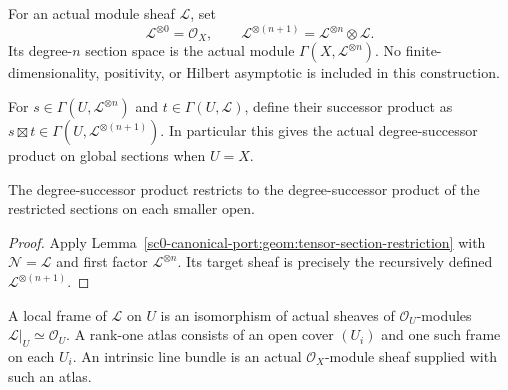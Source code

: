 \begin{definition}
\label{sc0-canonical-port:geom:tensor-sheaf-powers}
\leanok
For an actual module sheaf \(\mathcal L\), set
\[
 \mathcal L^{\otimes0}=\mathcal O_X,\qquad
 \mathcal L^{\otimes(n+1)}=\mathcal L^{\otimes n}\otimes\mathcal L.
\]
Its degree-\(n\) section space is the actual module
\(\Gamma(X,\mathcal L^{\otimes n})\).
No finite-dimensionality, positivity, or Hilbert asymptotic is
included in this construction.
\end{definition}

\begin{definition}
\label{sc0-canonical-port:geom:successor-section-product}
\leanok
For \(s\in\Gamma(U,\mathcal L^{\otimes n})\) and
\(t\in\Gamma(U,\mathcal L)\), define their successor product
as \(s\boxtimes t\in\Gamma(U,\mathcal L^{\otimes(n+1)})\).
In particular this gives the actual degree-successor product on
global sections when \(U=X\).
\end{definition}

\begin{lemma}
\label{sc0-canonical-port:geom:successor-product-restriction}
\leanok
The degree-successor product restricts to the degree-successor
product of the restricted sections on each smaller open.
\end{lemma}
\begin{proof}
Apply Lemma~\ref{sc0-canonical-port:geom:tensor-section-restriction} with
\(\mathcal N=\mathcal L\) and first factor
\(\mathcal L^{\otimes n}\). Its target sheaf is precisely the
recursively defined \(\mathcal L^{\otimes(n+1)}\).
\end{proof}

\begin{definition}
\label{sc0-canonical-port:geom:local-line-bundle-frames}
\leanok
A local frame of \(\mathcal L\) on \(U\) is an isomorphism of
actual sheaves of \(\mathcal O_U\)-modules
\(\mathcal L|_U\simeq\mathcal O_U\).
A rank-one atlas consists of an open cover \((U_i)\) and one such
frame on each \(U_i\). An intrinsic line bundle is an actual
\(\mathcal O_X\)-module sheaf supplied with such an atlas.
\end{definition}

